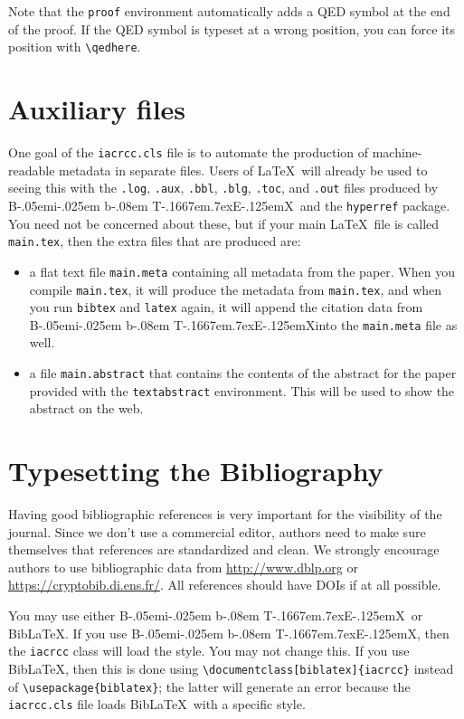 \documentclass{iacrcc}
\def\BibTeX{{\rm B\kern-.05em{\sc i\kern-.025em b}\kern-.08em
    T\kern-.1667em\lower.7ex\hbox{E}\kern-.125emX}}
\def\BibLaTeX{Bib\LaTeX}
\begin{document}
Note that the \texttt{proof} environment automatically adds a QED
symbol at the end of the proof.
If the QED symbol
is typeset at a wrong position, you can force its position with
\verb+\qedhere+.

\section{Auxiliary files}
One goal of the \texttt{iacrcc.cls}
  file is to automate the production of machine-readable metadata in
  separate files. Users of \LaTeX\ will already be used to seeing this
  with the \texttt{.log}, \texttt{.aux}, \texttt{.bbl}, \texttt{.blg},
  \texttt{.toc}, and \texttt{.out} files produced by \BibTeX\ 
  and the \texttt{hyperref} package.  You need not be concerned about
  these, but if your main \LaTeX\ file is called \texttt{main.tex},
  then the extra files that are produced are:
\begin{itemize}
\item a flat text file \texttt{main.meta} containing all metadata
  from the paper.  When you compile
  \texttt{main.tex}, it will produce the metadata from
  \texttt{main.tex}, and when you run \texttt{bibtex} and
  \texttt{latex} again, it will append the citation data from
  \BibTeX into the \texttt{main.meta} file as well.
\item a file \texttt{main.abstract} that contains
  the contents of the abstract for the paper provided with the
  \texttt{textabstract} environment. This will be used to show
  the abstract on the web.
\end{itemize}

\section{Typesetting the Bibliography}
\label{sec:biblio}

Having good bibliographic references is very important for the
visibility of the journal.  Since we don't use a commercial editor,
authors need to make sure themselves that references are standardized
and clean.  We strongly encourage authors to use bibliographic data
from \url{http://www.dblp.org} or \url{https://cryptobib.di.ens.fr/}.
All references should have DOIs if at all possible.

You may use either \BibTeX\ or \BibLaTeX. If you use \BibTeX,
then the \texttt{iacrcc} class will load the
\verb++ style.  You may not change
this. If you use \BibLaTeX, then this is done using
\verb+\documentclass[biblatex]{iacrcc}+ instead of
\verb+\usepackage{biblatex}+; the latter will generate an error
because the \texttt{iacrcc.cls} file loads \BibLaTeX\ with a
specific style.
\end{document}
